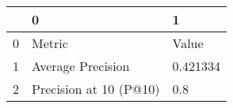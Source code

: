 \begin{tabular}{lll}
\toprule
{} &                       0 &         1 \\
\midrule
0 &                  Metric &     Value \\
1 &       Average Precision &  0.421334 \\
2 &  Precision at 10 (P@10) &       0.8 \\
\bottomrule
\end{tabular}
